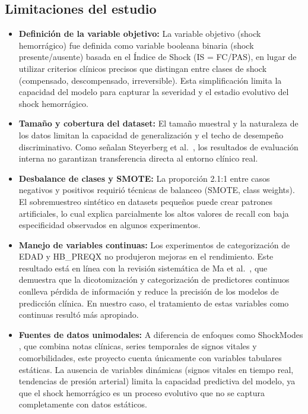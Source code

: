 \subsection{Limitaciones del estudio}

\begin{itemize}
    \item \textbf{Definición de la variable objetivo:} La variable objetivo (shock hemorrágico) fue definida como variable booleana binaria (shock presente/ausente) basada en el Índice de Shock (IS = FC/PAS), en lugar de utilizar criterios clínicos precisos que distingan entre clases de shock (compensado, descompensado, irreversible). Esta simplificación limita la capacidad del modelo para capturar la severidad y el estadio evolutivo del shock hemorrágico.

    \item \textbf{Tamaño y cobertura del dataset:} El tamaño muestral y la naturaleza de los datos limitan la capacidad de generalización y el techo de desempeño discriminativo. Como señalan Steyerberg et al.\ \cite{steyerberg2018}, los resultados de evaluación interna no garantizan transferencia directa al entorno clínico real.

    \item \textbf{Desbalance de clases y SMOTE:} La proporción 2.1:1 entre casos negativos y positivos requirió técnicas de balanceo (SMOTE, class weights). El sobremuestreo sintético en datasets pequeños puede crear patrones artificiales, lo cual explica parcialmente los altos valores de recall con baja especificidad observados en algunos experimentos.

    \item \textbf{Manejo de variables continuas:} Los experimentos de categorización de EDAD y HB\_PREQX no produjeron mejoras en el rendimiento. Este resultado está en línea con la revisión sistemática de Ma et al.\ \cite{ma2023}, que demuestra que la dicotomización y categorización de predictores continuos conlleva pérdida de información y reduce la precisión de los modelos de predicción clínica. En nuestro caso, el tratamiento de estas variables como continuas resultó más apropiado.

    \item \textbf{Fuentes de datos unimodales:} A diferencia de enfoques como ShockModes \cite{pal2022}, que combina notas clínicas, series temporales de signos vitales y comorbilidades, este proyecto cuenta únicamente con variables tabulares estáticas. La ausencia de variables dinámicas (signos vitales en tiempo real, tendencias de presión arterial) limita la capacidad predictiva del modelo, ya que el shock hemorrágico es un proceso evolutivo que no se captura completamente con datos estáticos.


\end{itemize}
